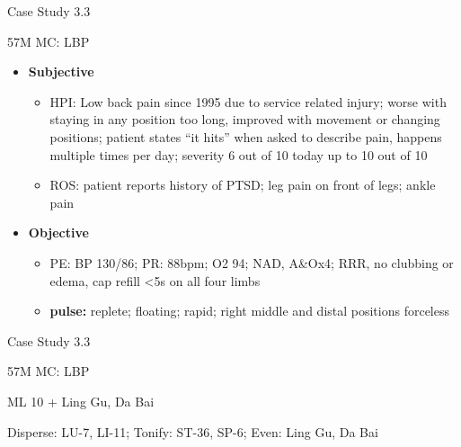 \begin{frame}{Case Study 3.3}

57M MC: LBP

\begin{itemize}
\item \textbf{Subjective}
\begin{itemize}
\item HPI: Low back pain since 1995 due to service related injury; worse with staying in any position too long, improved with movement or changing positions; patient states ``it hits'' when asked to describe pain, happens multiple times per day; severity 6 out of 10 today up to 10 out of 10 
\item ROS: patient reports history of PTSD; leg pain on front of legs; ankle pain
\end{itemize}
\item \textbf{Objective}
\begin{itemize}
\item PE: BP 130/86; PR: 88bpm; O2 94; NAD, A\&Ox4; RRR, no clubbing or edema, cap refill <5s on all four limbs
\item \textbf{pulse:} replete; floating; rapid; right middle and distal positions forceless
\end{itemize}
\end{itemize}

\end{frame}

\begin{frame}{Case Study 3.3}

57M MC: LBP

\begin{as}
ML 10 + Ling Gu, Da Bai
\end{as}

\vspace{1em}

\begin{pln}
Disperse: LU-7, LI-11; Tonify: ST-36, SP-6; Even: Ling Gu, Da Bai
\end{pln}

\end{frame}

